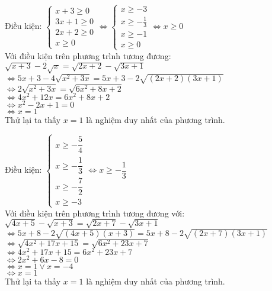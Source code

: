 \begin{Answer}{7}
Điều kiện: $ \begin{cases}
    x +3 \geq 0 \\
    3x +1 \geq 0 \\
    2x +2 \geq 0 \\
    x \geq 0
\end{cases}
\Leftrightarrow
    \begin{cases}
        x \geq -3 \\
        x \geq - \frac{1}{3} \\
        x \geq -1 \\
        x \geq 0
    \end{cases} \Leftrightarrow x \geq 0 $ \\
    Với điều kiện trên phương trình tương đương: \\
    $ \sqrt{x+3 } - 2 \sqrt{x } = \sqrt{2x +2 } - \sqrt{3x + 1} $ \\
    $ \Leftrightarrow 5x +3 -4 \sqrt{x^2 + 3x } = 5x + 3 - 2 \sqrt{(2x+2)(3x+1)}$ \\
    $ \Leftrightarrow 2 \sqrt{x^2 + 3x } = \sqrt{6x^2 + 8x + 2 } $ \\
    $ \Leftrightarrow 4x^2 + 12x = 6x^2 + 8x + 2 $ \\
    $ \Leftrightarrow x^2 -2x +1 =0 $ \\
    $ \Leftrightarrow x = 1 $ \\
    Thử lại ta thấy $x=1$ là nghiệm duy nhất của phương trình.
\end{Answer}
\begin{Answer}{8}
    Điều kiện: $ \begin{cases}
        x \geq -\dfrac{5 }{4 } \\
        x \geq - \dfrac{1 }{3 } \\
        x \geq - \dfrac{7}{2}  \\
        x \geq -3
    \end{cases} \Leftrightarrow x \geq -\dfrac{1 }{3 } $ \\
    Với điều kiện trên phương trình tương đương với: \\
    $\sqrt{4x +5 } -   \sqrt{x+3 }  =  \sqrt{2x +7 }- \sqrt{3x +1 }$ \\
$ \Leftrightarrow 5x +8 -2 \sqrt{(4x+5 )(x+3 ) } = 5x +8 -2 \sqrt{(2x+7)(3x+1) } $ \\
$ \Leftrightarrow \sqrt{4x^2 + 17x + 15 } = \sqrt{6x^2 + 23x + 7}  $ \\
$ \Leftrightarrow 4x^2 + 17x + 15 = 6x^2 +23 x +7 $ \\
$ \Leftrightarrow 2x^2 +6x -8 =0 $ \\
$ \Leftrightarrow x=1 \vee x= -4 $ \\
$ \Leftrightarrow x=1 $ \\
Thử lại ta thấy $ x=1 $ là nghiệm duy nhất của phương trình.
\end{Answer}
